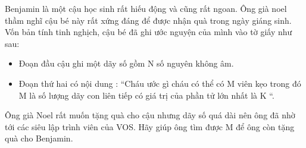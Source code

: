 Benjamin là một cậu học sinh rất hiếu động và cũng rất ngoan. Ông già noel thầm nghĩ cậu bé này rất xứng đáng để được nhận quà trong ngày giáng sinh. Vốn bản tính tinh nghịch, cậu bé đã ghi ước nguyện của mình vào tờ giấy như sau:
\begin{itemize}
	\item Đoạn đầu cậu ghi một dãy số gồm N số nguyên không âm.
	\item Đoạn thứ hai có nội dung : “Cháu ước gì cháu có thể có M viên kẹo trong đó M là số lượng dãy con liên tiếp có giá trị của phần tử lớn nhất là K “.
\end{itemize}

Ông già Noel rất muốn tặng quà cho cậu nhưng dãy số quá dài nên ông đã nhờ tới các siêu lập trình viên của VOS. Hãy giúp ông tìm được M để ông còn tặng quà cho Benjamin.